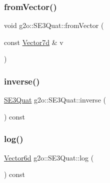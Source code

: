\mbox{\label{classg2o_1_1_s_e3_quat_a59aa7dffe9320761ee65bcdfa2bc61fd}} 
\subsubsection{\texorpdfstring{from\+Vector()}{fromVector()}}
{\footnotesize\ttfamily void g2o\+::\+S\+E3\+Quat\+::from\+Vector (\begin{DoxyParamCaption}\item[{const \mbox{\hyperlink{namespaceg2o_a4740ec41130f2ecc628c81f71261c8de}{Vector7d}} \&}]{v }\end{DoxyParamCaption})\hspace{0.3cm}{\ttfamily [inline]}}

\mbox{\label{classg2o_1_1_s_e3_quat_a894d361da0f27b25472b3a274deefed3}} 
\subsubsection{\texorpdfstring{inverse()}{inverse()}}
{\footnotesize\ttfamily \mbox{\hyperlink{classg2o_1_1_s_e3_quat}{S\+E3\+Quat}} g2o\+::\+S\+E3\+Quat\+::inverse (\begin{DoxyParamCaption}{ }\end{DoxyParamCaption}) const\hspace{0.3cm}{\ttfamily [inline]}}

\mbox{\label{classg2o_1_1_s_e3_quat_ab19dfa20f3d0ed68f07a81ea90bcfc76}} 
\subsubsection{\texorpdfstring{log()}{log()}}
{\footnotesize\ttfamily \mbox{\hyperlink{namespaceg2o_a3bc8a4fbac86f158d548be81af2f929b}{Vector6d}} g2o\+::\+S\+E3\+Quat\+::log (\begin{DoxyParamCaption}{ }\end{DoxyParamCaption}) const\hspace{0.3cm}{\ttfamily [inline]}}


